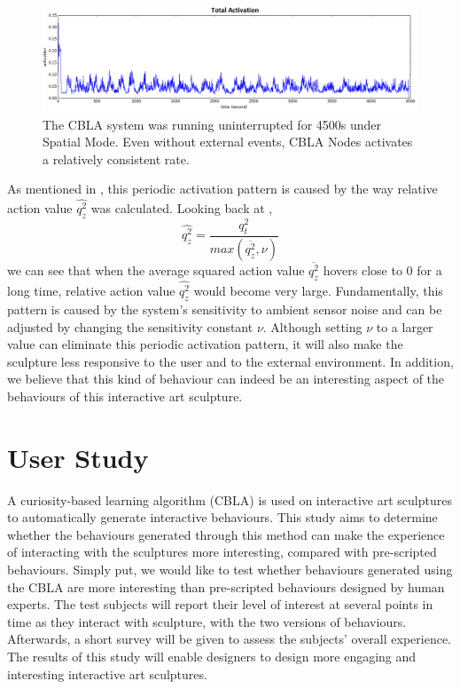 \begin{figure} [!htbp]
	\centering
	\includegraphics[width=1.0\textwidth]{"fig/validations/multi-cluster experiment cyclic activation"}
	\caption[Periodic spontaneous activation over a period of 4500s]{The CBLA system was running uninterrupted for 4500s under Spatial Mode. Even without external events, CBLA Nodes activates a relatively consistent rate.}
	\label{fig:multi-cluster experiment cyclic activation}
\end{figure}

As mentioned in , this periodic activation pattern is caused by the way relative action value $\widehat{q^2_z}$ was calculated. Looking back at 
, \[\widehat{q^2_z} = \frac{q_t^2}{max(\overline{q^2_z}, \nu)}\] we can see that when the average squared action value $\overline{q^2_z}$ hovers close to 0 for a long time, relative action value $\widehat{q^2_z}$ would become very large. Fundamentally, this pattern is caused by the system's sensitivity to ambient sensor noise and can be adjusted by changing the sensitivity constant $\nu$. Although setting $\nu$ to a larger value can eliminate this periodic activation pattern, it will also make the sculpture less responsive to the user and to the external environment. In addition, we believe that this kind of behaviour can indeed be an interesting aspect of the behaviours of this interactive art sculpture. 


\section{User Study}\label{sec:user-study}

A curiosity-based learning algorithm (CBLA) is used on interactive art sculptures to automatically generate interactive behaviours. This study aims to determine whether the behaviours generated through this method can make the experience of interacting with the sculptures more interesting, compared with pre-scripted behaviours. Simply put, we would like to test whether behaviours generated using the CBLA are more interesting than pre-scripted behaviours designed by human experts. The test subjects will report their level of interest at several points in time as they interact with sculpture, with the two versions of behaviours. Afterwards, a short survey will be given to assess the subjects' overall experience. The results of this study will enable designers to design more engaging and interesting interactive art sculptures. 

